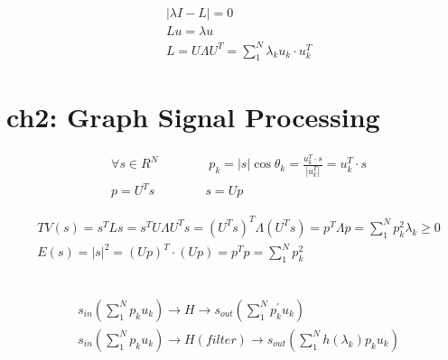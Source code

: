 \documentclass{article}
\begin{document}
%
\begin{align*}
    & | \lambda I - L | = 0  \\[3pt]
    & L u = \lambda u  \\[3pt]
    & L = U \Lambda U^{T} = \sum_{1}^{N} \lambda_{k} u_{k} \cdot u_{k}^{T} 
\end{align*}


\newpage
\section*{ch2: Graph Signal Processing}


%
\begin{align*}
    & \forall s \in R^{N} \qquad \qquad 
      p_{k} = |s| \cos \theta_{k} = 
      \frac{u_{k}^{T} \cdot s}{|u_{k}^{T}|} = 
      u_{k}^{T} \cdot s  \\[3pt]
    & p = U^{T} s \qquad \qquad s = U p 
\end{align*}

%
\begin{align*}
    & TV(s) = s^{T} L s = s^{T} U \Lambda U^{T} s = 
      ( U^{T} s )^{T} \Lambda ( U^{T} s ) = 
      p^{T} \Lambda p = \sum_{1}^{N} 
      p_{k}^{2} \lambda_{k} \ge 0  \\[3pt]
    & E(s) = |s|^{2} = ( U p )^{T} \cdot ( U p ) = 
      p^{T} p = \sum_{1}^{N} p_{k}^{2} 
\end{align*}

~ \\[3pt]
\begin{align*}
    & s_{in} \left ( \sum_{1}^{N} p_{k} {u_{k}} \right )
      \to H \to 
      s_{out} \left ( \sum_{1}^{N} p_{k}^{'} {u_{k}} \right )  \\[3pt]
    & s_{in} \left ( \sum_{1}^{N} p_{k} {u_{k}} \right )
      \to H(filter) \to 
      s_{out} \left ( \sum_{1}^{N} h(\lambda_{k}) p_{k} u_{k} \right )  \\[3pt]
\end{align*}
\end{document}
